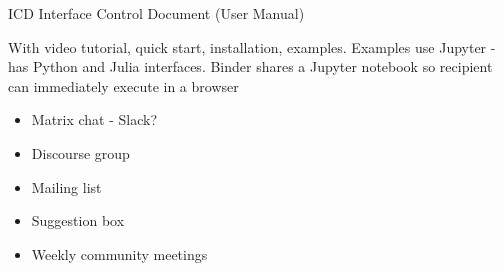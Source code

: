 ICD Interface Control Document (User Manual)

With video tutorial, quick start, installation, examples. %
Examples use Jupyter - has Python and Julia interfaces. Binder shares a Jupyter notebook so
recipient can immediately execute in a browser
\begin{itemize}
\item Matrix chat - Slack?
\item Discourse group
\item Mailing list
\item Suggestion box
\item Weekly community meetings
\end{itemize}
